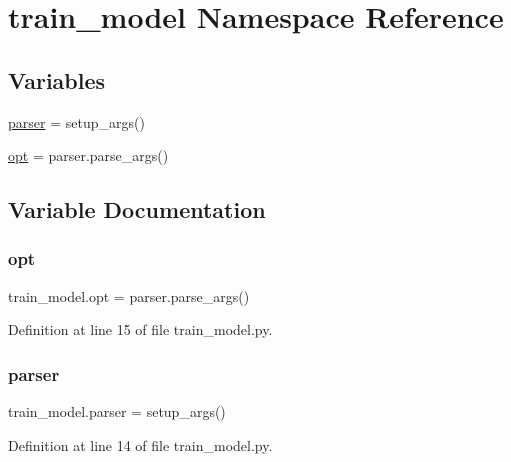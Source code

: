 \hypertarget{namespacetrain__model}{}\section{train\+\_\+model Namespace Reference}
\label{namespacetrain__model}
\subsection*{Variables}
\begin{DoxyCompactItemize}
\item 
\hyperlink{namespacetrain__model_ab036cc629f61c94d93f79d9071e25e62}{parser} = setup\+\_\+args()
\item 
\hyperlink{namespacetrain__model_a81a7509e6c032fb47a5d28990039557a}{opt} = parser.\+parse\+\_\+args()
\end{DoxyCompactItemize}


\subsection{Variable Documentation}
\mbox{\label{namespacetrain__model_a81a7509e6c032fb47a5d28990039557a}} 
\subsubsection{\texorpdfstring{opt}{opt}}
{\footnotesize\ttfamily train\+\_\+model.\+opt = parser.\+parse\+\_\+args()}



Definition at line 15 of file train\+\_\+model.\+py.

\mbox{\label{namespacetrain__model_ab036cc629f61c94d93f79d9071e25e62}} 
\subsubsection{\texorpdfstring{parser}{parser}}
{\footnotesize\ttfamily train\+\_\+model.\+parser = setup\+\_\+args()}



Definition at line 14 of file train\+\_\+model.\+py.

